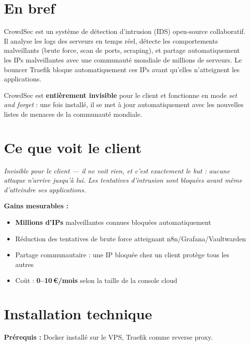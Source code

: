 \documentclass[11pt, a4paper]{article}
\begin{document}
\ficheHeader

\section*{En bref}
CrowdSec est un système de détection d'intrusion (IDS) open-source collaboratif. Il analyse les logs des serveurs en temps réel, détecte les comportements malveillants (brute force, scan de ports, scraping), et partage automatiquement les IPs malveillantes avec une communauté mondiale de millions de serveurs. Le bouncer Traefik bloque automatiquement ces IPs avant qu'elles n'atteignent les applications.

\begin{pointcle}
  CrowdSec est \textbf{entièrement invisible} pour le client et fonctionne en mode \textit{set and forget} : une fois installé, il se met à jour automatiquement avec les nouvelles listes de menaces de la communauté mondiale.
\end{pointcle}

\section{Ce que voit le client}

\begin{clientbox}
  \textit{Invisible pour le client — il ne voit rien, et c'est exactement le but : aucune attaque n'arrive jusqu'à lui. Les tentatives d'intrusion sont bloquées avant même d'atteindre ses applications.}
\end{clientbox}

\textbf{Gains mesurables :}
\begin{itemize}
  \item \textbf{Millions d'IPs} malveillantes connues bloquées automatiquement
  \item Réduction des tentatives de brute force atteignant n8n/Grafana/Vaultwarden
  \item Partage communautaire : une IP bloquée chez un client protège tous les autres
  \item Coût : \textbf{0–10\,€/mois} selon la taille de la console cloud
\end{itemize}

\section{Installation technique}

\textbf{Prérequis :} Docker installé sur le VPS, Traefik comme reverse proxy.
\end{document}
